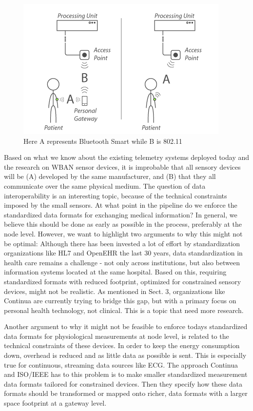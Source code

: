 \begin{figure}[H]
\centering
\includegraphics[scale=1]{img/figures/architecture.png}
\caption{Here A represents Bluetooth Smart while B is 802.11}
\label{fig:architecture}
\end{figure}

\noindent
Based on what we know about the existing telemetry systems deployed today and the research on WBAN sensor devices, it is improbable that all sensory devices will be (A) developed by the same manufacturer, and (B) that they all communicate over the same physical medium. The question of data interoperability is an interesting topic, because of the technical constraints imposed by the small sensors. At what point in the pipeline do we enforce the standardized data formats for exchanging medical information? In general, we believe this should be done as early as possible in the process, preferably at the node level. However, we want to highlight two arguments to why this might not be optimal: Although there has been invested a lot of effort by standardization organizations like HL7 and OpenEHR the last 30 years, data standardization in health care remains a challenge - not only across institutions, but also between information systems located at the same hospital. Based on this, requiring standardized formats with reduced footprint, optimized for constrained sensory devices, might not be realistic. As mentioned in Sect. 3, organizations like Continua are currently trying to bridge this gap, but with a primary focus on personal health technology, not clinical. This is a topic that need more research.

Another argument to why it might not be feasible to enforce todays standardized data formats for physiological measurements at node level, is related to the technical constraints of these devices. In order to keep the energy consumption down, overhead is reduced and as little data as possible is sent. This is especially true for continuous, streaming data sources like ECG. The approach Continua and ISO/IEEE has to this problem is to make smaller standardized measurement data formats tailored for constrained devices. Then they specify how these data formats should be transformed or mapped onto richer, data formats with a larger space footprint at a gateway level.

